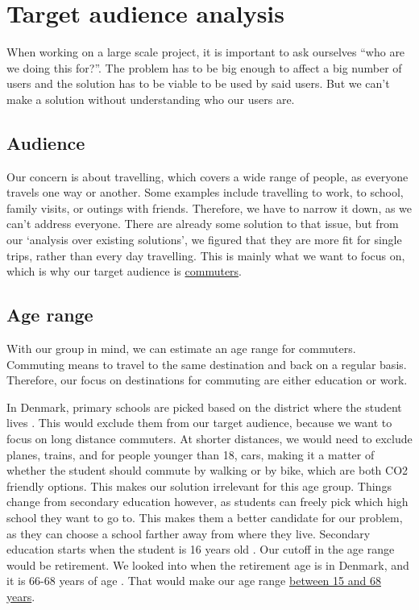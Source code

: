 \section{Target audience analysis}

When working on a large scale project, it is important to ask ourselves ``who are we doing this for?''. The problem has to be big enough to affect a big number of users and the solution has to be viable to be used by said users. But we can't make a solution without understanding who our users are.

\subsection{Audience}

Our concern is about travelling, which covers a wide range of people, as everyone travels one way or another. Some examples include travelling to work, to school, family visits, or outings with friends. Therefore, we have to narrow it down, as we can't address everyone. There are already some solution to that issue, but from our `analysis over existing solutions', we figured that they are more fit for single trips, rather than every day travelling. This is mainly what we want to focus on, which is why our target audience is \underline{commuters}.

\subsection{Age range}

With our group in mind, we can estimate an age range for commuters. Commuting means to travel to the same destination and back on a regular basis. Therefore, our focus on destinations for commuting are either education or work.

In Denmark, primary schools are picked based on the district where the student lives \cite{primary_school}. This would exclude them from our target audience, because we want to focus on long distance commuters. At shorter distances, we would need to exclude planes, trains, and for people younger than 18, cars, making it a matter of whether the student should commute by walking or by bike, which are both CO2 friendly options. This makes our solution irrelevant for this age group. Things change from secondary education however, as students can freely pick which high school they want to go to. This makes them a better candidate for our problem, as they can choose a school farther away from where they live. Secondary education starts when the student is 16 years old \cite{secondary_school}. Our cutoff in the age range would be retirement. We looked into when the retirement age is in Denmark, and it is 66-68 years of age \cite{retirement}. That would make our age range \underline{between 15 and 68 years}.

